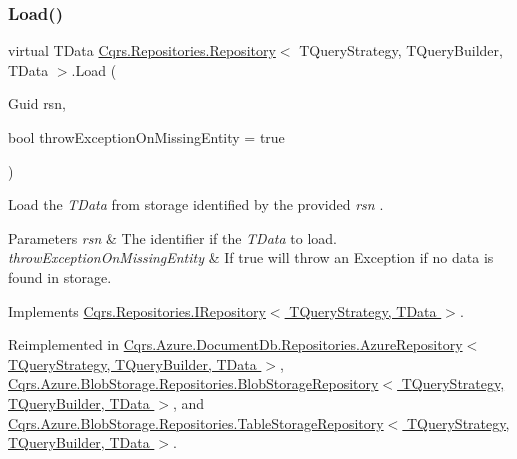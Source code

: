 \mbox{\label{classCqrs_1_1Repositories_1_1Repository_a444e9dfe4710be90940dbb6dec9d856f_a444e9dfe4710be90940dbb6dec9d856f}} 
\subsubsection{\texorpdfstring{Load()}{Load()}}
{\footnotesize\ttfamily virtual T\+Data \hyperlink{classCqrs_1_1Repositories_1_1Repository}{Cqrs.\+Repositories.\+Repository}$<$ T\+Query\+Strategy, T\+Query\+Builder, T\+Data $>$.Load (\begin{DoxyParamCaption}\item[{Guid}]{rsn,  }\item[{bool}]{throw\+Exception\+On\+Missing\+Entity = {\ttfamily true} }\end{DoxyParamCaption})\hspace{0.3cm}{\ttfamily [virtual]}}



Load the {\itshape T\+Data}  from storage identified by the provided {\itshape rsn} . 


\begin{DoxyParams}{Parameters}
{\em rsn} & The identifier if the {\itshape T\+Data}  to load.\\
\hline
{\em throw\+Exception\+On\+Missing\+Entity} & If true will throw an Exception if no data is found in storage.\\
\hline
\end{DoxyParams}


Implements \hyperlink{interfaceCqrs_1_1Repositories_1_1IRepository_ae545451c48d1e2b5693db73e169e100d_ae545451c48d1e2b5693db73e169e100d}{Cqrs.\+Repositories.\+I\+Repository$<$ T\+Query\+Strategy, T\+Data $>$}.



Reimplemented in \hyperlink{classCqrs_1_1Azure_1_1DocumentDb_1_1Repositories_1_1AzureRepository_a22c58163e101a6cb80f891bed6114380_a22c58163e101a6cb80f891bed6114380}{Cqrs.\+Azure.\+Document\+Db.\+Repositories.\+Azure\+Repository$<$ T\+Query\+Strategy, T\+Query\+Builder, T\+Data $>$}, \hyperlink{classCqrs_1_1Azure_1_1BlobStorage_1_1Repositories_1_1BlobStorageRepository_a7c5a3ca4d92cf4954508fb3e583eb49e_a7c5a3ca4d92cf4954508fb3e583eb49e}{Cqrs.\+Azure.\+Blob\+Storage.\+Repositories.\+Blob\+Storage\+Repository$<$ T\+Query\+Strategy, T\+Query\+Builder, T\+Data $>$}, and \hyperlink{classCqrs_1_1Azure_1_1BlobStorage_1_1Repositories_1_1TableStorageRepository_a7238452f19c9d51b5733df7701920605_a7238452f19c9d51b5733df7701920605}{Cqrs.\+Azure.\+Blob\+Storage.\+Repositories.\+Table\+Storage\+Repository$<$ T\+Query\+Strategy, T\+Query\+Builder, T\+Data $>$}.

